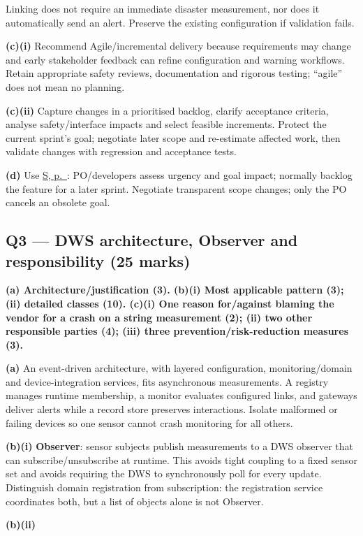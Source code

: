 \begin{studycolumns}
\vspace{0pt}









Linking does not require an immediate disaster measurement, nor does it automatically send an alert. Preserve the existing configuration if validation fails.

\textbf{(c)(i)} Recommend Agile/\allowbreak{}incremental delivery because requirements may change and early stakeholder feedback can refine configuration and warning workflows. Retain appropriate safety reviews, documentation and rigorous testing; ``agile'' does not mean no planning.

\textbf{(c)(ii)} Capture changes in a prioritised backlog, clarify acceptance criteria, analyse safety/\allowbreak{}interface impacts and select feasible increments. Protect the current sprint's goal; negotiate later scope and re-estimate affected work, then validate changes with regression and acceptance tests.

\textbf{(d)} Use \hyperref[answer-scrum]{S, p.\ \pageref{answer-scrum}}: PO/developers assess urgency and goal impact; normally backlog the feature for a later sprint. Negotiate transparent scope changes; only the PO cancels an obsolete goal.

\subsection*{Q3 --- DWS architecture, Observer and responsibility (25 marks)}
\textbf{(a) Architecture/\allowbreak{}justification (3). (b)(i) Most applicable pattern (3); (ii) detailed classes (10). (c)(i) One reason for/\allowbreak{}against blaming the vendor for a crash on a string measurement (2); (ii) two other responsible parties (4); (iii) three prevention/\allowbreak{}risk-reduction measures (3).}


\textbf{(a)} An event-driven architecture, with layered configuration, monitoring/\allowbreak{}domain and device-integration services, fits asynchronous measurements. A registry manages runtime membership, a monitor evaluates configured links, and gateways deliver alerts while a record store preserves interactions. Isolate malformed or failing devices so one sensor cannot crash monitoring for all others.

\textbf{(b)(i)} \textbf{Observer}: sensor subjects publish measurements to a DWS observer that can subscribe/\allowbreak{}unsubscribe at runtime. This avoids tight coupling to a fixed sensor set and avoids requiring the DWS to synchronously poll for every update. Distinguish domain registration from subscription: the registration service coordinates both, but a list of objects alone is not Observer.

\textbf{(b)(ii)}
\end{studycolumns}


